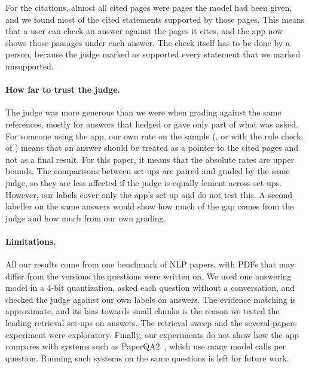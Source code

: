For the citations, almost all cited pages were pages the model had been given, and we found most
of the cited statements supported by those pages. This means that a user can check an answer
against the pages it cites, and the app now shows those passages under each answer. The check
itself has to be done by a person, because the judge marked as supported every statement that
we marked unsupported.

\paragraph{How far to trust the judge.} The judge was more generous than we were when grading
against the same references, mostly for answers that hedged or gave only part of what was asked.
For someone using the app, our own rate on the sample (\JudgeCheckHumanCorrect{}, or
\JudgeCheckHumanRuleCorrect{} with the rule check, of \JudgeCheckN{}) means that an answer should
be treated as a pointer to the cited pages and not as a final result. For this paper, it means
that the absolute rates are upper bounds. The comparisons between set-ups are paired and graded by
the same judge, so they are less affected if the judge is equally lenient across set-ups.
However, our labels cover only the app's set-up and do not test this. A second labeller on the
same answers would show how much of the gap comes from the judge and how much from our own
grading.

\paragraph{Limitations.} All our results come from one benchmark of NLP papers, with PDFs that
may differ from the versions the questions were written on. We used one answering model in a
4-bit quantization, asked each question without a conversation, and checked the judge against
our own labels on \JudgeCheckN{} answers. The evidence matching is approximate, and its bias
towards small chunks is the reason we tested the leading retrieval set-ups on answers. The
retrieval sweep and the several-papers experiment were exploratory. Finally, our experiments do
not show how the app compares with systems such as PaperQA2~\cite{skarlinski2024paperqa2}, which
use many model calls per question. Running such systems on the same questions is left for
future work.
